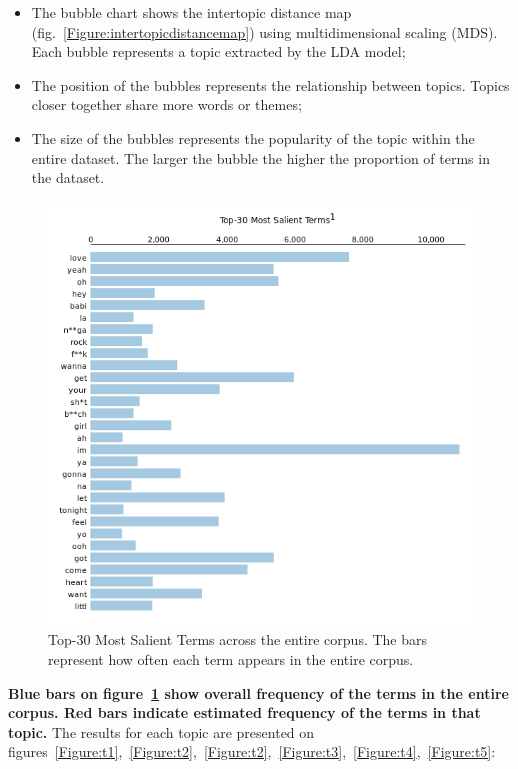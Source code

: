 \begin{itemize}
  \item The bubble chart shows the intertopic distance map
    (fig.~\ref{Figure:intertopicdistancemap}) using multidimensional scaling
    (MDS). Each bubble represents a topic extracted by the LDA model;
  \item The position of the bubbles represents the relationship between topics.
    Topics closer together share more words or themes;
  \item The size of the bubbles represents the popularity of the topic within
    the entire dataset. The larger the bubble the higher the proportion of
    terms in the dataset.
\end{itemize}



\begin{center}
\begin{figure}[H]
  \centering
  \includegraphics[width=6in]{img/topics/png/general.png}
  \caption{Top-30 Most Salient Terms across the entire corpus. The bars
  represent how often each term appears in the entire corpus.}
  \label{Figure:lda_general}
\end{figure}
\end{center}

\textbf{Blue bars on figure~\ref{Figure:lda_general} show overall frequency of
the terms in the entire corpus. Red bars indicate estimated frequency of the
terms in that topic.} The results for each topic are presented on
figures~\ref{Figure:t1},~\ref{Figure:t2},~\ref{Figure:t2},~\ref{Figure:t3},~\ref{Figure:t4},~\ref{Figure:t5}:

